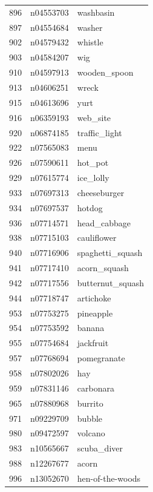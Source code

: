 \begin{table}
\begin{tabular}{cll}
896 & n04553703 & washbasin \\
897 & n04554684 & washer \\
902 & n04579432 & whistle \\
903 & n04584207 & wig \\
910 & n04597913 & wooden_spoon \\
913 & n04606251 & wreck \\
915 & n04613696 & yurt \\
916 & n06359193 & web_site \\
920 & n06874185 & traffic_light \\
922 & n07565083 & menu \\
926 & n07590611 & hot_pot \\
929 & n07615774 & ice_lolly \\
933 & n07697313 & cheeseburger \\
934 & n07697537 & hotdog \\
936 & n07714571 & head_cabbage \\
938 & n07715103 & cauliflower \\
940 & n07716906 & spaghetti_squash \\
941 & n07717410 & acorn_squash \\
942 & n07717556 & butternut_squash \\
944 & n07718747 & artichoke \\
953 & n07753275 & pineapple \\
954 & n07753592 & banana \\
955 & n07754684 & jackfruit \\
957 & n07768694 & pomegranate \\
958 & n07802026 & hay \\
959 & n07831146 & carbonara \\
965 & n07880968 & burrito \\
971 & n09229709 & bubble \\
980 & n09472597 & volcano \\
983 & n10565667 & scuba_diver \\
988 & n12267677 & acorn \\
996 & n13052670 & hen-of-the-woods \\
\bottomrule
\end{tabular}
\end{table}
